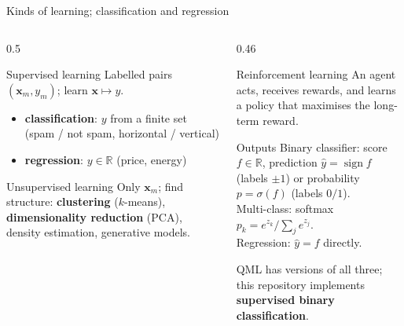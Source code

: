 \documentclass[aspectratio=169,11pt]{beamer}
\newcommand{\key}[1]{{\color{qdark}\textbf{#1}}}
\newcommand{\bx}{\mathbf x}
\begin{document}
\begin{frame}[label=fKinds]{Kinds of learning; classification and regression}
  \begin{columns}[T]
    \begin{column}{0.5\textwidth}
      \small
      \begin{block}{Supervised learning}
        Labelled pairs $(\bx_m, y_m)$; learn $\bx \mapsto y$.
        \begin{itemize}\itemsep0pt
          \item \key{classification}: $y$ from a finite set (spam / not spam, horizontal / vertical)
          \item \key{regression}: $y \in \mathbb R$ (price, energy)
        \end{itemize}
      \end{block}
      \begin{block}{Unsupervised learning}
        Only $\bx_m$; find structure: \key{clustering} ($k$-means), \key{dimensionality reduction} (PCA), density estimation, generative models.
      \end{block}
    \end{column}
    \begin{column}{0.46\textwidth}
      \small
      \begin{block}{Reinforcement learning}
        An agent acts, receives rewards, and learns a policy that maximises the long-term reward.
      \end{block}
      \begin{exampleblock}{Outputs}
        \scriptsize
        Binary classifier: score $f \in \mathbb R$, prediction $\hat y = \operatorname{sign} f$ (labels $\pm1$) or probability $p = \sigma(f)$
        (labels $0/1$).\\
        Multi-class: softmax $p_k = e^{z_k}/\sum_je^{z_j}$.\\
        Regression: $\hat y = f$ directly.
      \end{exampleblock}
      \small QML has versions of all three; this repository implements \key{supervised binary classification}.
    \end{column}
  \end{columns}
\end{frame}
\end{document}
